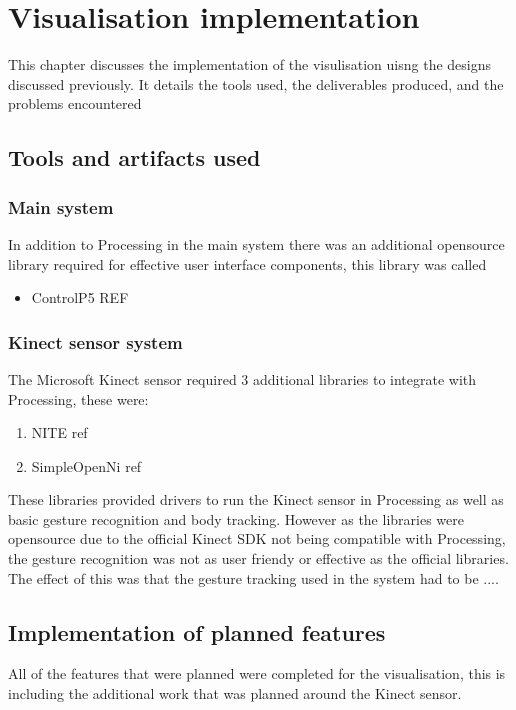 \chapter{Visualisation implementation}\label{C:sd}
This chapter discusses the implementation of the visulisation uisng the designs discussed previously. It details the tools used, the deliverables produced, and the problems encountered
\section{Tools and artifacts used}



\subsection{Main system}
In addition to Processing in the main system there was an additional opensource library required for effective user interface components, this library was called
\begin{itemize}
 \item ControlP5 REF~
\end{itemize}


\subsection{Kinect sensor system}
The Microsoft Kinect sensor required 3 additional libraries to integrate with Processing, these were:
\begin{enumerate}
 \item NITE ref~
 \item SimpleOpenNi ref~
\end{enumerate}
These libraries provided drivers to run the Kinect sensor in Processing as well as basic gesture recognition and body tracking. However as the libraries were opensource due to the official Kinect SDK not being compatible with Processing, the gesture recognition was not as user friendy or effective as the official libraries. The effect of this was that the gesture tracking used in the system had to be .... ~
\section{Implementation of planned features}
All of the features that were planned were completed for the visualisation, this is including the additional work that was planned around the Kinect sensor.

